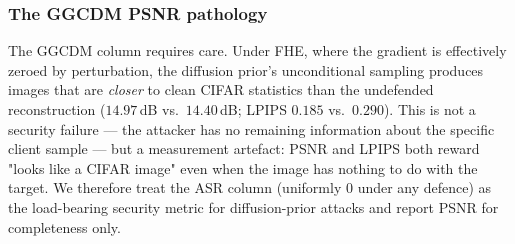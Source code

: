 \subsubsection*{The GGCDM PSNR pathology}
\label{sec:vi-ggcdm-pathology}
The GGCDM column requires care. Under FHE, where the gradient is
effectively zeroed by perturbation, the diffusion prior's
unconditional sampling produces images that are \emph{closer} to
clean CIFAR statistics than the undefended reconstruction
($14.97$\,dB vs.\ $14.40$\,dB; LPIPS $0.185$ vs.\ $0.290$).
This is not a security failure — the attacker has no remaining
information about the specific client sample — but a measurement
artefact: PSNR and LPIPS both reward "looks like a CIFAR image"
even when the image has nothing to do with the target. We
therefore treat the ASR column (uniformly $0$ under any defence)
as the load-bearing security metric for diffusion-prior attacks
and report PSNR for completeness only.
